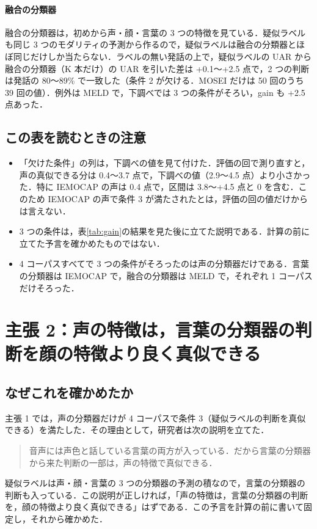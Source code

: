 \documentclass[a4paper,11pt]{ltjsarticle}
\begin{document}
\paragraph{融合の分類器}
融合の分類器は，初めから声・顔・言葉の 3 つの特徴を見ている．疑似ラベルも同じ 3 つのモダリティの予測から作るので，疑似ラベルは融合の分類器とほぼ同じだけしか当たらない．ラベルの無い発話の上で，疑似ラベルの UAR から融合の分類器（K 本だけ）の UAR を引いた差は +0.1〜+2.5 点で，2 つの判断は発話の 80〜89\% で一致した（条件 2 が欠ける．MOSEI だけは 50 回のうち 39 回の値）．例外は MELD で，下調べでは 3 つの条件がそろい，gain も +2.5 点あった．

\subsection{この表を読むときの注意}
\begin{itemize}
  \item 「欠けた条件」の列は，下調べの値を見て付けた．評価の回で測り直すと，声の真似できる分は 0.4〜3.7 点で，下調べの値（2.9〜4.5 点）より小さかった．特に IEMOCAP の声は 0.4 点で，区間は \textminus{}3.8〜+4.5 点と 0 を含む．このため IEMOCAP の声で条件 3 が満たされたとは，評価の回の値だけからは言えない．
  \item 3 つの条件は，表\ref{tab:gain}の結果を見た後に立てた説明である．計算の前に立てた予言を確かめたものではない．
  \item 4 コーパスすべてで 3 つの条件がそろったのは声の分類器だけである．言葉の分類器は IEMOCAP で，融合の分類器は MELD で，それぞれ 1 コーパスだけそろった．
\end{itemize}

\section{主張 2：声の特徴は，言葉の分類器の判断を顔の特徴より良く真似できる}

\subsection{なぜこれを確かめたか}

主張 1 では，声の分類器だけが 4 コーパスで条件 3（疑似ラベルの判断を真似できる）を満たした．その理由として，研究者は次の説明を立てた．
\begin{quote}
音声には声色と話している言葉の両方が入っている．だから言葉の分類器から来た判断の一部は，声の特徴で真似できる．
\end{quote}
疑似ラベルは声・顔・言葉の 3 つの分類器の予測の積なので，言葉の分類器の判断も入っている．この説明が正しければ，「声の特徴は，言葉の分類器の判断を，顔の特徴より良く真似できる」はずである．この予言を計算の前に書いて固定し，それから確かめた．
\end{document}
